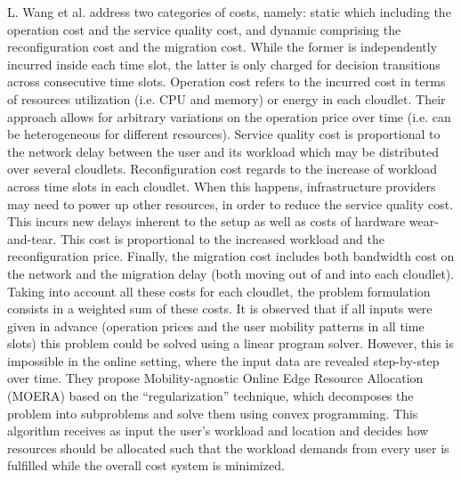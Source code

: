 \noindent\tab L. Wang \cite{wang2018moera} et al. address two categories of costs, namely: static which including the operation cost and the service quality cost, and dynamic comprising the reconfiguration cost and the migration cost. While the former is independently incurred inside each time slot, the latter is only charged for decision transitions across consecutive time slots. Operation cost refers to the incurred cost in terms of resources utilization (i.e. CPU and memory) or energy in each cloudlet. Their approach allows for arbitrary variations on the operation price over time (i.e. can be heterogeneous for different resources). Service quality cost is proportional to the network delay between the user and its workload which may be distributed over several cloudlets. Reconfiguration cost regards to the increase of workload across time slots in each cloudlet. When this happens, infrastructure providers may need to power up other resources, in order to reduce the service quality cost. This incurs new delays inherent to the setup as well as costs of hardware wear-and-tear. This cost is proportional to the increased workload and the reconfiguration price. Finally, the migration cost includes both bandwidth cost on the network and the migration delay (both moving out of and into each cloudlet). Taking into account all these costs for each cloudlet, the problem formulation consists in a weighted sum of these costs. It is observed that if all inputs were given in advance (operation prices and the user mobility patterns in all time slots) this problem could be solved using a linear program solver. However, this is impossible in the online setting, where the input data are revealed step-by-step over time. They propose Mobility-agnostic Online Edge Resource Allocation (MOERA) based on the ``regularization'' technique, which decomposes the problem into subproblems and solve them using convex programming. This algorithm receives as input the user’s workload and location and decides how resources should be allocated such that the workload demands from every user is fulfilled while the overall cost system is minimized. %


